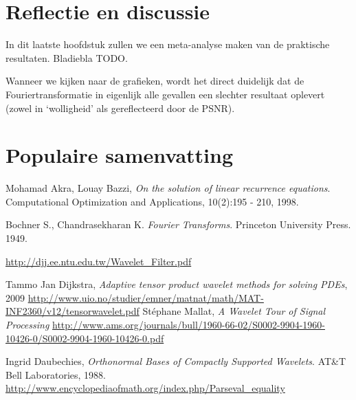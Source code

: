 \documentclass[11pt]{report}
\theoremstyle{plain}
\theoremstyle{remark}
\begin{document}
\chapter{Reflectie en discussie}
In dit laatste hoofdstuk zullen we een meta-analyse maken van de praktische resultaten. Bladiebla TODO.

Wanneer we kijken naar de grafieken, wordt het direct duidelijk dat de Fouriertransformatie in eigenlijk alle gevallen een slechter resultaat oplevert (zowel in `wolligheid' als gereflecteerd door de PSNR).
\chapter{Populaire samenvatting}

\begin{thebibliography}{11}

  Mohamad Akra, Louay Bazzi,
  \emph{On the solution of linear recurrence equations}.
  Computational Optimization and Applications, 
  10(2):195 - 210,
  1998.

  Bochner S., Chandrasekharan K. 
  \emph{Fourier Transforms}. 
  Princeton University Press.
  1949.

	\url{http://djj.ee.ntu.edu.tw/Wavelet_Filter.pdf}

Tammo Jan Dijkstra,
\emph{Adaptive tensor product wavelet methods for solving PDEs}, 2009
\url{http://www.uio.no/studier/emner/matnat/math/MAT-INF2360/v12/tensorwavelet.pdf}
St\'ephane Mallat,
\emph{A Wavelet Tour of Signal Processing}
\url{http://www.ams.org/journals/bull/1960-66-02/S0002-9904-1960-10426-0/S0002-9904-1960-10426-0.pdf}

Ingrid Daubechies, \emph{Orthonormal Bases of Compactly Supported Wavelets}.
AT\&T Bell Laboratories, 1988.
\url{http://www.encyclopediaofmath.org/index.php/Parseval_equality}

\end{thebibliography}
\end{document}
